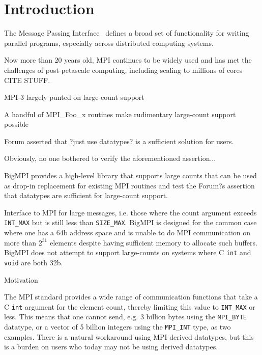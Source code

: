 
\section{Introduction}

The Message Passing Interface~\cite{mpiforum:94, mpiforum:96, mpiforum:09, mpiforum:12} 
defines a broad set of functionality for writing parallel programs, especially across
distributed computing systems.

Now more than 20 years old, MPI continues to be widely used and has met the challenges of
post-petascale computing, including scaling to millions of cores CITE STUFF.



MPI-3 largely punted on large-count support

A handful of MPI\_Foo\_x routines make rudimentary large-count support possible

Forum asserted that ?just use datatypes? is a sufficient solution for users.

Obviously, no one bothered to verify the aforementioned assertion...

BigMPI provides a high-level library that supports large counts that can be used as 
drop-in replacement for existing MPI routines and test the Forum?s assertion 
that datatypes are sufficient for large-count support.



Interface to MPI for large messages, i.e. those where the count argument
exceeds \texttt{INT\_MAX} but is still less than \texttt{SIZE\_MAX}.
BigMPI is designed for the common case where one has a 64b address
space and is unable to do MPI communication on more than $2^{31}$ elements
despite having sufficient memory to allocate such buffers.
BigMPI does not attempt to support large-counts on systems where
C \texttt{int} and \texttt{void\*} are both 32b.

Motivation

The MPI standard provides a wide range of communication functions that
take a C \texttt{int} argument for the element count, thereby limiting this
value to \texttt{INT\_MAX} or less.
This means that one cannot send, e.g. 3 billion bytes using the \texttt{MPI\_BYTE} 
datatype, or a vector of 5 billion integers using the \texttt{MPI\_INT} type, as
two examples.
There is a natural workaround using MPI derived datatypes, but this is
a burden on users who today may not be using derived datatypes.

